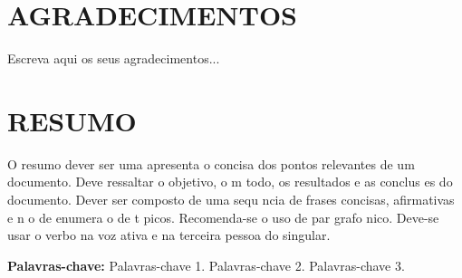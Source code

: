 \documentclass{article}
\begin{document}
\thispagestyle{empty}
\null
\vfill
\begin{flushright}
\parbox{4cm}{
}
\end{flushright}
\thispagestyle{empty}
\newpage


\thispagestyle{empty}
\section*{\normalsize \centering \textbf{AGRADECIMENTOS}}

Escreva aqui os seus agradecimentos...

\newpage


\thispagestyle{empty}
\null
\vfill
\begin{flushright}
\parbox{8cm}{
}
\end{flushright}
\newpage


\thispagestyle{empty}
\section*{\normalsize \centering \textbf{RESUMO}}

\noindent  O resumo dever  ser uma apresenta o concisa dos pontos relevantes de um documento. Deve ressaltar o objetivo, o m todo, os resultados e as conclus es do documento. Dever  ser composto de uma sequ ncia de frases concisas, afirmativas e n o de enumera o de t picos. Recomenda-se o uso de par grafo  nico. Deve-se usar o verbo na voz ativa e na terceira pessoa do singular.

\vspace*{0.5cm}

\noindent\textbf{Palavras-chave:} Palavras-chave 1. Palavras-chave 2. Palavras-chave 3.
 \newpage


\thispagestyle{empty}
\end{document}
